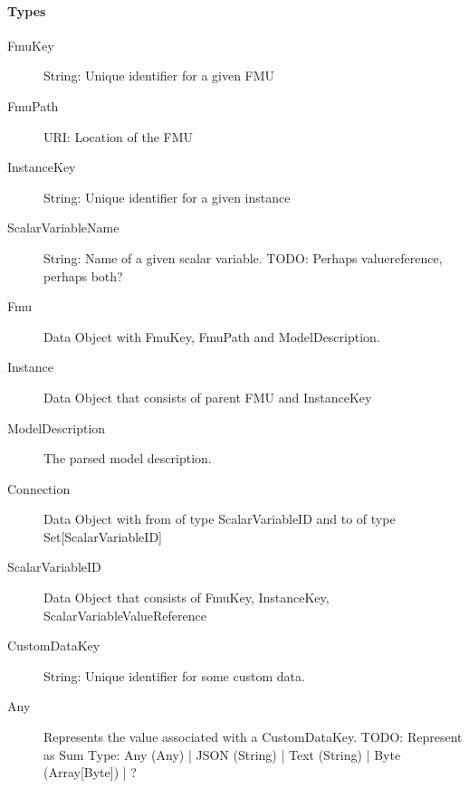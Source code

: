 \paragraph{Types}
\begin{description}
  \item[FmuKey] String: Unique identifier for a given FMU
  \item[FmuPath] URI: Location of the FMU
  \item[InstanceKey] String: Unique identifier for a given instance
  \item[ScalarVariableName] String: Name of a given scalar variable.
    TODO: Perhaps valuereference, perhaps both?
  \item[Fmu] Data Object with FmuKey, FmuPath and ModelDescription.
  \item[Instance] Data Object that consists of parent FMU and InstanceKey
  \item[ModelDescription] The parsed model description.
  \item[Connection] Data Object with from of type ScalarVariableID and to of type Set[ScalarVariableID]
  \item[ScalarVariableID] Data Object that consists of FmuKey,
    InstanceKey, ScalarVariableValueReference
  \item[CustomDataKey] String: Unique identifier for some custom data.
  \item[Any] Represents the value associated with a CustomDataKey.
    TODO: Represent as Sum Type: Any (Any) | JSON (String) | Text (String) |
    Byte (Array[Byte]) | ?
\end{description}

